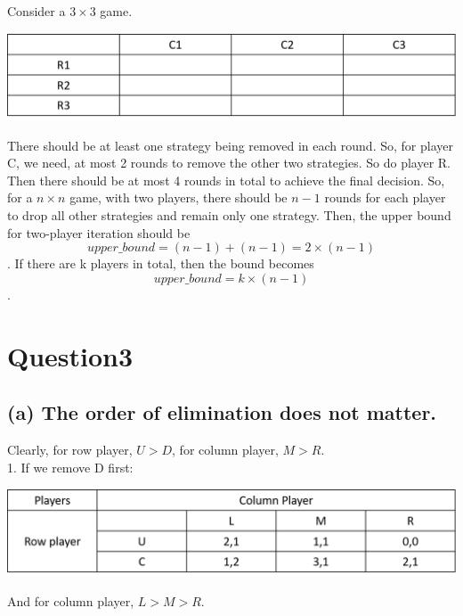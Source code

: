 \documentclass[12pt]{article}
\newcommand{\e}[1]{$ #1 $}
\newcommand{\ee}[1]{$$ #1 $$}
\begin{document}
\begin{spacing}{1.5}
        Consider a \e{3 \times 3} game.
        \begin{center}
            \includegraphics[scale = .5]{pic/question_2.png}
        \end{center}
        There should be at least one strategy being removed in each round. So, for player C,
        we need, at most 2 rounds to remove the other two strategies. So do player R.
        Then there should be at most 4 rounds in total to achieve the final decision.
        So, for a  \e{n \times n} game, with two players, there should be \e{n-1} rounds 
        for each player to drop all other strategies and remain only one strategy.
        Then, the upper bound for two-player iteration should be
        \ee{upper\_bound = (n - 1) + (n - 1) = 2 \times (n - 1)}.
        If there are k players in total, then the bound becomes
        \ee{upper\_bound = k \times (n - 1)}.

    \section{Question3}
        \subsection{(a) The order of elimination does not matter.}
            Clearly, for row player, $U > D$, for column player, $M > R$.\\

            1. If we remove D first:\\
            
            \begin{center}
                \includegraphics[scale = 0.5]{pic/remove_D_first.png}
            \end{center}
            
            And for column player, $L > M > R$.
            

\end{spacing}
\end{document}
